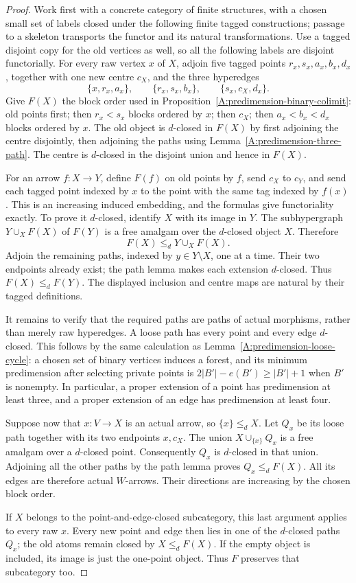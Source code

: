 \begin{proof}
Work first with a concrete category of finite structures, with a
chosen small set of labels closed under the following finite tagged
constructions; passage to a skeleton transports the functor and its
natural transformations. Use a tagged disjoint copy for the old
vertices as well, so all the following labels are disjoint
functorially. For every raw vertex $x$ of $X$, adjoin
five tagged points $r_x,s_x,a_x,b_x,d_x$, together with one new
centre $c_X$, and the three hyperedges
\[
 \{x,r_x,a_x\},\qquad \{r_x,s_x,b_x\},\qquad
 \{s_x,c_X,d_x\}.
\]
Give $F(X)$ the block order used in
Proposition~\ref{A:predimension-binary-colimit}: old points first;
then $r_x<s_x$ blocks ordered by $x$; then $c_X$; then
$a_x<b_x<d_x$ blocks ordered by $x$. The old object is $d$-closed
in $F(X)$ by first adjoining the centre disjointly, then adjoining
the paths using Lemma~\ref{A:predimension-three-path}.
The centre is $d$-closed in the disjoint union and hence in $F(X)$.

For an arrow $f:X\to Y$, define $F(f)$ on old points by $f$, send
$c_X$ to $c_Y$, and send each tagged point indexed by $x$ to the
point with the same tag indexed by $f(x)$. This is an increasing
induced embedding, and the formulas give functoriality exactly.
To prove it $d$-closed, identify $X$ with its image in $Y$.
The subhypergraph $Y\cup_X F(X)$ of $F(Y)$ is a free amalgam over
the $d$-closed object $X$. Therefore
\[
 F(X)\leq_d Y\cup_X F(X).
\]
Adjoin the remaining paths, indexed by $y\in Y\setminus X$,
one at a time. Their two endpoints already exist; the path lemma
makes each extension $d$-closed. Thus $F(X)\leq_d F(Y)$.
The displayed inclusion and centre maps are natural by their
tagged definitions.

It remains to verify that the required paths are paths of actual
morphisms, rather than merely raw hyperedges. A loose path has
every point and every edge $d$-closed. This follows by the same
calculation as Lemma~\ref{A:predimension-loose-cycle}: a chosen
set of binary vertices induces a forest, and its minimum
predimension after selecting private points is
$2|B'|-e(B')\geq |B'|+1$ when $B'$ is nonempty. In particular,
a proper extension of a point has predimension at least three,
and a proper extension of an edge has predimension at least four.

Suppose now that $x:V\to X$ is an actual arrow, so $\{x\}\leq_d X$.
Let $Q_x$ be its loose path together with its two endpoints $x,c_X$.
The union $X\cup_{\{x\}}Q_x$ is a free amalgam over a $d$-closed
point. Consequently $Q_x$ is $d$-closed in that union. Adjoining
all the other paths by the path lemma proves $Q_x\leq_d F(X)$.
All its edges are therefore actual $W$-arrows. Their directions
are increasing by the chosen block order.

If $X$ belongs to the point-and-edge-closed subcategory, this last
argument applies to every raw $x$. Every new point and edge then
lies in one of the $d$-closed paths $Q_x$; the old atoms remain
closed by $X\leq_d F(X)$. If the empty object is included, its
image is just the one-point object. Thus $F$ preserves that
subcategory too.
\end{proof}


